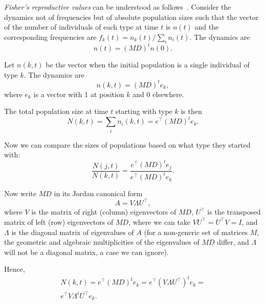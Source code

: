\documentclass[9pt, a4paper, twocolumn]{extarticle}
\newcommand*{\tr}{^\intercal}
\begin{document}
\emph{Fisher's reproductive values} can be understood as follows~\citep[ch.~10]{Grafen2006,Otto2007}.
Consider the dynamics not of frequencies but of absolute population sizes such that the vector of the number of individuals of each type at time $t$ is $n(t)$ and the corresponding frequencies are $f_k(t) = n_k(t) / \sum_i{n_i(t)}$.
The dynamics are
\begin{equation}
n(t) = (MD)^t n(0).
\end{equation}

Let $n(k, t)$ be the vector when the initial population is a single individual of type $k$.
The dynamics are
\begin{equation}
n(k,t) = (MD)^t e_k,
\end{equation}
where $e_k$ is a vector with 1 at position $k$ and 0 elsewhere.

The total population size at time $t$ starting with type $k$ is then
\begin{equation}
N(k,t) = \sum_i{n_i(k,t)} = e\tr (MD)^t e_k.
\end{equation}

Now we can compare the sizes of populations based on what type they started
with:
\begin{equation}
\frac{N(j,t)}{N(k,t)} = 
\frac{e\tr (MD)^t e_j}{e\tr (MD)^t e_k}.
\end{equation}

Now write $MD$ in its Jordan canonical form 
\begin{equation}
A = V \Lambda U\tr,
\end{equation}
where $V$ is the matrix of right (column) eigenvectors of $MD$,
$U\tr$ is the transposed matrix of left (row) eigenvectors of $MD$,
where we can take $V U\tr = U\tr V = I$, 
and $\Lambda$ is the diagonal matrix of eigenvalues of $A$ 
(for a non-generic set of matrices $M$, the geometric and algebraic multiplicities of the eigenvalues of $MD$ differ, and $\Lambda$ will not be a diagonal matrix, a case we can ignore).

Hence,
\begin{multline}
N(k, t) = 
e\tr (MD)^t e_k =
e\tr  (V \Lambda U\tr)^t e_k = \\
e\tr V \Lambda^t U\tr e_k.
\end{multline}
\end{document}
